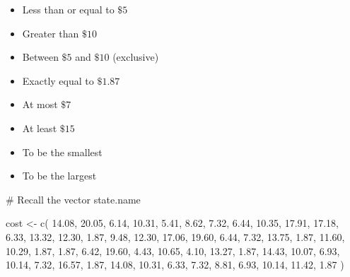 \documentclass[
  letterpaper,
  DIV=11,
  numbers=noendperiod]{scrreprt}
\newenvironment{Shaded}{\begin{snugshade}}{\end{snugshade}}
\newcommand{\CommentTok}[1]{\textcolor[rgb]{0.37,0.37,0.37}{#1}}
\newcommand{\FloatTok}[1]{\textcolor[rgb]{0.68,0.00,0.00}{#1}}
\newcommand{\FunctionTok}[1]{\textcolor[rgb]{0.28,0.35,0.67}{#1}}
\newcommand{\NormalTok}[1]{\textcolor[rgb]{0.00,0.23,0.31}{#1}}
\newcommand{\OtherTok}[1]{\textcolor[rgb]{0.00,0.23,0.31}{#1}}
\begin{document}
\begin{itemize}
\item
  Less than or equal to \(\$5\)
\item
  Greater than \(\$10\)
\item
  Between \(\$5\) and \(\$10\) (exclusive)
\item
  Exactly equal to \(\$1.87\)
\item
  At most \(\$7\)
\item
  At least \(\$15\)
\item
  To be the smallest
\item
  To be the largest
\end{itemize}

\begin{Shaded}
\begin{Highlighting}[]
\CommentTok{\# Recall the vector \textasciigrave{}state.name\textasciigrave{}}

\NormalTok{cost }\OtherTok{\textless{}{-}} \FunctionTok{c}\NormalTok{(}
  \FloatTok{14.08}\NormalTok{, }\FloatTok{20.05}\NormalTok{, }\FloatTok{6.14}\NormalTok{, }\FloatTok{10.31}\NormalTok{, }\FloatTok{5.41}\NormalTok{, }\FloatTok{8.62}\NormalTok{, }\FloatTok{7.32}\NormalTok{,}
  \FloatTok{6.44}\NormalTok{, }\FloatTok{10.35}\NormalTok{, }\FloatTok{17.91}\NormalTok{, }\FloatTok{17.18}\NormalTok{, }\FloatTok{6.33}\NormalTok{, }\FloatTok{13.32}\NormalTok{, }\FloatTok{12.30}\NormalTok{, }\FloatTok{1.87}\NormalTok{,}
  \FloatTok{9.48}\NormalTok{, }\FloatTok{12.30}\NormalTok{, }\FloatTok{17.06}\NormalTok{, }\FloatTok{19.60}\NormalTok{, }\FloatTok{6.44}\NormalTok{, }\FloatTok{7.32}\NormalTok{, }\FloatTok{13.75}\NormalTok{, }\FloatTok{1.87}\NormalTok{,}
  \FloatTok{11.60}\NormalTok{, }\FloatTok{10.29}\NormalTok{, }\FloatTok{1.87}\NormalTok{, }\FloatTok{1.87}\NormalTok{, }\FloatTok{6.42}\NormalTok{, }\FloatTok{19.60}\NormalTok{, }\FloatTok{4.43}\NormalTok{, }\FloatTok{10.65}\NormalTok{,}
  \FloatTok{4.10}\NormalTok{, }\FloatTok{13.27}\NormalTok{, }\FloatTok{1.87}\NormalTok{, }\FloatTok{14.43}\NormalTok{, }\FloatTok{10.07}\NormalTok{, }\FloatTok{6.93}\NormalTok{, }\FloatTok{10.14}\NormalTok{, }\FloatTok{7.32}\NormalTok{,}
  \FloatTok{16.57}\NormalTok{, }\FloatTok{1.87}\NormalTok{, }\FloatTok{14.08}\NormalTok{, }\FloatTok{10.31}\NormalTok{, }\FloatTok{6.33}\NormalTok{, }\FloatTok{7.32}\NormalTok{, }\FloatTok{8.81}\NormalTok{, }\FloatTok{6.93}\NormalTok{,}
  \FloatTok{10.14}\NormalTok{, }\FloatTok{11.42}\NormalTok{, }\FloatTok{1.87}
\NormalTok{)}
\end{Highlighting}
\end{Shaded}
\end{document}
